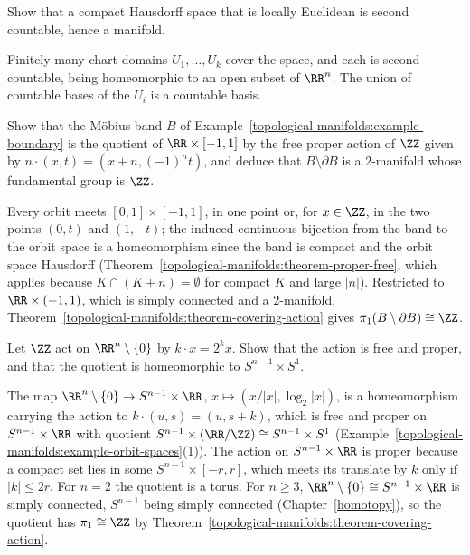 \begin{exercise}\label{topological-manifolds:exercise-compact-second-countable}
Show that a compact Hausdorff space that is locally Euclidean is second countable, hence a manifold.
\end{exercise}

\begin{solution}
Finitely many chart domains $U_1, \ldots, U_k$ cover the space, and each is second countable, being homeomorphic to an open subset of $\RR^n$. The union of countable bases of the $U_i$ is a countable basis.
\end{solution}

\begin{exercise}\label{topological-manifolds:exercise-mobius}
Show that the Möbius band $B$ of Example~\ref{topological-manifolds:example-boundary} is the quotient of $\RR \times [-1, 1]$ by the free proper action of $\ZZ$ given by $n \cdot (x, t) = (x + n, (-1)^nt)$, and deduce that $B \setminus \partial B$ is a
$2$-manifold whose fundamental group is $\ZZ$.
\end{exercise}

\begin{solution}
Every orbit meets $[0, 1] \times [-1, 1]$, in one point or, for $x \in \ZZ$, in the two points $(0, t)$ and $(1, -t)$; the induced continuous bijection from the band to the orbit space is a homeomorphism since the band is compact and the
orbit space Hausdorff (Theorem~\ref{topological-manifolds:theorem-proper-free}, which applies because $K \cap (K + n) = \emptyset$ for compact $K$ and large $|n|$). Restricted to $\RR \times (-1, 1)$, which is simply connected and a
$2$-manifold, Theorem~\ref{topological-manifolds:theorem-covering-action} gives $\pi_1(B \setminus \partial B) \cong \ZZ$.
\end{solution}

\begin{exercise}\label{topological-manifolds:exercise-hopf}
Let $\ZZ$ act on $\RR^n \setminus \{0\}$ by $k \cdot x = 2^kx$. Show that the action is free and proper, and that the quotient is homeomorphic to $S^{n-1} \times S^1$.
\end{exercise}

\begin{solution}
The map $\RR^n \setminus \{0\} \to S^{n-1} \times \RR$, $x \mapsto (x/|x|, \log_2|x|)$, is a homeomorphism carrying the action to $k \cdot (u, s) = (u, s + k)$, which is free and proper on $S^{n-1} \times \RR$ with quotient
$S^{n-1} \times (\RR/\ZZ) \cong S^{n-1} \times S^1$ (Example~\ref{topological-manifolds:example-orbit-spaces}(1)). The action on $S^{n-1} \times \RR$ is proper
because a compact set lies in some $S^{n-1} \times [-r, r]$, which meets its translate by $k$ only if $|k| \leq 2r$. For $n = 2$ the quotient is a torus. For $n \geq 3$, $\RR^n \setminus \{0\} \cong S^{n-1} \times \RR$ is simply
connected, $S^{n-1}$ being simply connected (Chapter~\ref{homotopy}), so the quotient has $\pi_1 \cong \ZZ$ by Theorem~\ref{topological-manifolds:theorem-covering-action}.
\end{solution}

